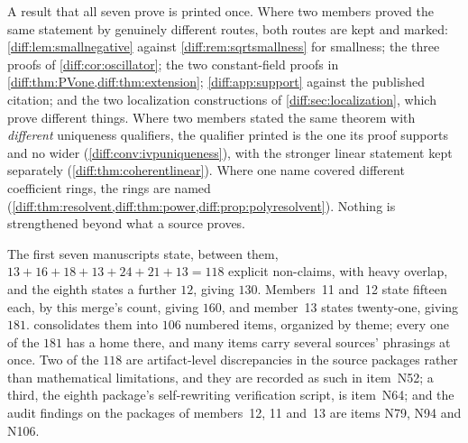 \documentclass[11pt,letterpaper]{article}
\numberwithin{equation}{section}
\theoremstyle{definition}
\theoremstyle{remark}
\begin{document}
\begin{remark}
\label{diff:rem:mergemethod}
A result that all seven prove is printed once. Where two members proved the
same statement by genuinely different routes, both routes are kept and marked:
\cref{diff:lem:smallnegative} against \cref{diff:rem:sqrtsmallness} for
smallness; the three proofs of \cref{diff:cor:oscillator}; the two
constant-field proofs in
\cref{diff:thm:PVone,diff:thm:extension}; \cref{diff:app:support} against the
published citation; and the two localization constructions of
\cref{diff:sec:localization}, which prove different things. Where two members
stated the same theorem with \emph{different} uniqueness qualifiers, the
qualifier printed is the one its proof supports and no wider
(\cref{diff:conv:ivpuniqueness}), with the stronger linear statement kept
separately (\cref{diff:thm:coherentlinear}). Where one name covered different
coefficient rings, the rings are named
(\cref{diff:thm:resolvent,diff:thm:power,diff:prop:polyresolvent}). Nothing is
strengthened beyond what a source proves.

The first seven manuscripts state, between them,
$13+16+18+13+24+21+13=118$ explicit non-claims, with heavy overlap, and the
eighth states a further $12$, giving $130$. Members~11 and~12 state fifteen
each, by this merge's count, giving $160$, and member~13 states twenty-one,
giving $181$.
 consolidates them into $106$ numbered items,
organized by theme; every one of the $181$ has a home there, and many items
carry several sources' phrasings at once. Two of the $118$ are artifact-level
discrepancies in the source packages rather than mathematical limitations, and
they are recorded as such in item~N52; a third, the eighth package's
self-rewriting verification script, is item~N64; and the audit findings on the
packages of members~12, 11 and~13 are items N79, N94 and N106.


\end{remark}
\end{document}
